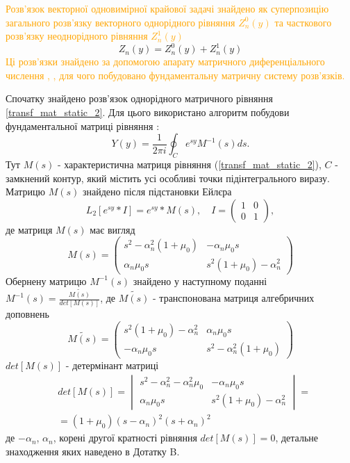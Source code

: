 \textcolor{orange}
{
Розв'язок векторної одновимірної крайової задачі знайдено як суперпозицію загального розв'язку векторного однорідного рівняння $Z_n^0(y)$
та часткового розв'язку неоднорідного рівняння $Z_n^1(y)$
}
\begin{equation}
    Z_n(y) = Z_n^0(y) + Z_n^1(y)
\end{equation}
\textcolor{orange}
{
Ці розв'язки знайдено за допомогою апарату матричного диференціального числення \cite{popov_4}, \cite{gantmaher},
для чого побудовано фундаментальну матричну систему розв'язків.
}

Спочатку знайдено розв'язок однорідного матричного рівняння \eqref{transf_mat_static_2}.
Для цього використано алгоритм побудови фундаментальної матриці рівняння \cite{gantmaher}:
\begin{equation}
    Y(y) = \frac{1}{2\pi i} \oint_C e^{sy} M^{-1}(s)ds.
\end{equation}
Тут $M(s)$ - характеристична матриця рівняння (\ref{transf_mat_static_2}), $C$ - замкнений контур, який містить усі особливі точки підінтегрального виразу.
Матрицю $M(s)$ знайдено після підстановки Ейлєра
\begin{equation}
    L_2\left[ e^{sy}*I \right] = e^{sy} * M(s), \quad I = \begin{pmatrix} 1 & 0 \\ 0 & 1 \end{pmatrix},
\end{equation}
де матриця $M(s)$ має вигляд
\begin{equation}
    M(s) = \begin{pmatrix}
        s^2 -\alpha_n^2(1 + \mu_0) & -\alpha_n \mu_0 s \\
        \alpha_n \mu_0 s & s^2 (1 + \mu_0) -\alpha_n^2
     \end{pmatrix}
\end{equation}
Обернену матрицю $M^{-1}(s)$ знайдено у наступному поданні $M^{-1}(s) = \frac{\widetilde{M(s)}}{det[M(s)]}$, 
де $\widetilde{M(s)}$ - транспонована матриця алгебричних доповнень
\begin{equation}
    \widetilde{M(s)} = \begin{pmatrix}
        s^2 (1 + \mu_0) -\alpha_n^2 & \alpha_n \mu_0 s \\
        -\alpha_n \mu_0 s & s^2 -\alpha_n^2(1 + \mu_0)
     \end{pmatrix}
\end{equation}
$det[M(s)]$ - детермінант матриці
\begin{align}
    &det[M(s)] = \begin{vmatrix}
        s^2 - \alpha_n^2 - \alpha_n^2\mu_0 & -\alpha_n \mu_0 s \\
        \alpha_n \mu_0 s & s^2 (1 + \mu_0) -\alpha_n^2
     \end{vmatrix} = \nonumber \\
    &=(1+\mu_0)(s - \alpha_n)^2(s + \alpha_n)^2
\end{align}
де $-\alpha_n$, $\alpha_n$, корені другої кратності рівняння $det[M(s)]=0$, детальне знаходження яких наведено в Дотатку B.

